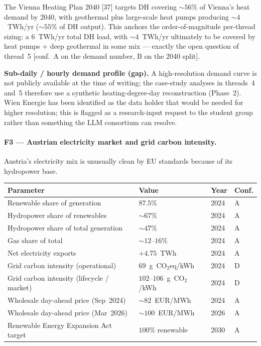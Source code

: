 \documentclass{article}
\begin{document}
The Vienna Heating Plan 2040 [37] targets DH covering $\sim 56\%$
of Vienna's heat demand by 2040, with geothermal plus large-scale
heat pumps producing $\sim 4$~TWh/yr ($\sim 55\%$ of DH output).
This anchors the order-of-magnitude per-thread sizing: a 6~TWh/yr
total DH load, with $\sim 4$~TWh/yr ultimately to be covered by
heat pumps + deep geothermal in some mix --- exactly the open
question of thread~5 [conf.\ A on the demand number, B on the
2040 split].

\textbf{Sub-daily / hourly demand profile (gap).} A high-resolution
demand curve is not publicly available at the time of writing; the
case-study analyses in threads~4 and~5 therefore use a synthetic
heating-degree-day reconstruction (Phase~2). Wien Energie has been
identified as the data holder that would be needed for higher
resolution; this is flagged as a research-input request to the
student group rather than something the LLM consortium can resolve.

\paragraph{F3 --- Austrian electricity market and grid carbon intensity.}
Austria's electricity mix is unusually clean by EU standards
because of its hydropower base.

\begin{center}
\begin{tabular}{llll}
\hline
\textbf{Parameter} & \textbf{Value} & \textbf{Year} & \textbf{Conf.} \\
\hline
Renewable share of generation              & $87.5\%$              & 2024 & A \\
Hydropower share of renewables             & $\sim 67\%$           & 2024 & A \\
Hydropower share of total generation       & $\sim 47\%$           & 2024 & A \\
Gas share of total                         & $\sim 12$--$16\%$     & 2024 & A \\
Net electricity exports                    & $+4.75$~TWh           & 2024 & A \\
Grid carbon intensity (operational)        & $69$~g~CO$_2$eq/kWh   & 2024 & D \\
Grid carbon intensity (lifecycle / market) & $102$--$106$~g~CO$_2$/kWh & 2024 & D \\
Wholesale day-ahead price (Sep~2024)       & $\sim 82$~EUR/MWh     & 2024 & A \\
Wholesale day-ahead price (Mar~2026)       & $\sim 100$~EUR/MWh    & 2026 & A \\
Renewable Energy Expansion Act target      & $100\%$ renewable     & 2030 & A \\
\hline
\end{tabular}
\end{center}
\end{document}
